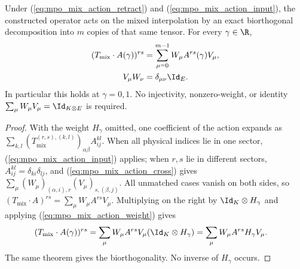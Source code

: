 \begin{lemma}
    \label{thm:mpo_mixed_action_exact}
    \leanok
    Under (\ref{eq:mpo_mix_action_retract}) and
    (\ref{eq:mpo_mix_action_input}), the constructed operator acts on
    the mixed interpolation by an exact biorthogonal decomposition
    into $m$ copies of that same tensor. For every $\gamma\in\R$,
    \begin{align}
        (T_{\mathrm{mix}}\cdot A(\gamma))^{rs}
                    & =\sum_{\mu=0}^{m-1}W_\mu A^{rs}(\gamma)V_\mu,
        \label{eq:mpo_mix_action_exact}                             \\
        V_\mu W_\nu & =\delta_{\mu\nu}\Id_E.
        \notag
    \end{align}
    In particular this holds at $\gamma=0,1$. No injectivity,
    nonzero-weight, or identity $\sum_\mu W_\mu V_\mu=\Id_{K\otimes E}$
    is required.
\end{lemma}
\begin{proof}
    \leanok
    With the weight $H_\gamma$ omitted, one coefficient of the
    action expands as $\sum_{k,l}(T_{\mathrm{mix}}^{(r,s),(k,l)})_{\alpha\beta}
        A^{kl}_{ij}$. When all physical indices lie in one sector,
    (\ref{eq:mpo_mix_action_input}) applies; when $r,s$ lie in different sectors,
    $A^{kl}_{ij}=\delta_{ki}\delta_{lj}$, and
    (\ref{eq:mpo_mix_action_cross}) gives
    $\sum_\mu(W_\mu)_{(\alpha,i),r}(V_\mu)_{s,(\beta,j)}$.
    All unmatched cases vanish on both sides, so
    $(T_{\mathrm{mix}}\cdot A)^{rs}=\sum_\mu W_\mu A^{rs}V_\mu$.
    Multiplying on the right by $\Id_K\otimes H_\gamma$ and applying
    (\ref{eq:mpo_mix_action_weight}) gives
    \begin{align}
        (T_{\mathrm{mix}}\cdot A(\gamma))^{rs}
         & =\sum_\mu W_\mu A^{rs}V_\mu(\Id_K\otimes H_\gamma)
        =\sum_\mu W_\mu A^{rs}H_\gamma V_\mu.\notag
    \end{align}
    The same theorem gives the biorthogonality. No inverse of
    $H_\gamma$ occurs.
\end{proof}

